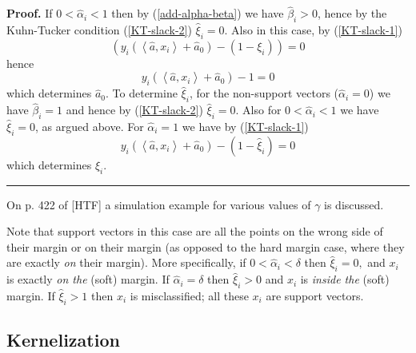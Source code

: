 \documentclass[11pt,twoside]{article}%
\theoremstyle{change}
\newenvironment{proof}[1][Proof]{\textbf{#1.} }{\ \rule{0.5em}{0.5em}}
\begin{document}
\begin{proof}
If $0<\hat{\alpha}_{i}<1$ then by (\ref{add-alpha-beta}) we have $\hat{\beta
}_{i}>0$, hence by the Kuhn-Tucker condition (\ref{KT-slack-2}) $\hat{\xi}%
_{i}=0$. Also in this case, by (\ref{KT-slack-1})
\[
\left(  y_{i}\left(  \left\langle \hat{a},x_{i}\right\rangle +\hat{a}%
_{0}\right)  -\left(  1-\xi_{i}\right)  \right)  =0
\]
hence
\[
y_{i}\left(  \left\langle \hat{a},x_{i}\right\rangle +\hat{a}_{0}\right)  -1=0
\]
which determines $\hat{a}_{0}$. To determine $\hat{\xi}_{i}$, for the
non-support vectors ($\hat{\alpha}_{i}=0$) we have $\hat{\beta}_{i}=1$ and
hence by (\ref{KT-slack-2}) $\hat{\xi}_{i}=0$. Also for $0<\hat{\alpha}_{i}<1
$ we have $\hat{\xi}_{i}=0$, as argued above. For $\hat{\alpha}_{i}=1$ we have
by (\ref{KT-slack-1})
\[
y_{i}\left(  \left\langle \hat{a},x_{i}\right\rangle +\hat{a}_{0}\right)
-\left(  1-\hat{\xi}_{i}\right)  =0
\]
which determines $\hat{\xi}_{i}$.
\end{proof}

\bigskip\bigskip On p. 422 of [HTF] a simulation example for various values of
$\gamma$ is discussed.

Note that support vectors in this case are all the points on the wrong side of
their margin or on their margin (as opposed to the hard margin case, where
they are exactly \textit{on }their margin). More specifically, if
$0<\hat{\alpha}_{i}<\delta$ then $\hat{\xi}_{i}=0,$ and $x_{i}$ is exactly
\textit{on the }(soft) margin. If $\hat{\alpha}_{i}=\delta$ then $\hat{\xi
}_{i}>0$ and $x_{i}$ is \textit{inside the }(soft) margin. If $\hat{\xi}_{i}>1
$ then $x_{i}$ is misclassified; all these $x_{i}$ are support vectors.

\subsection{Kernelization}
\end{document}
